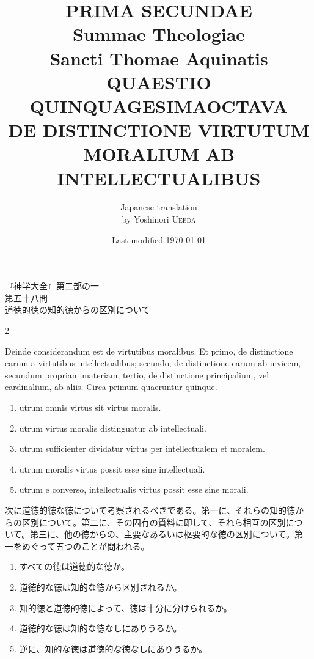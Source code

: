 \documentclass[paper=a4paper,fontsize=10pt,jafontsize=9pt,titlepage]{jlreq}
\title{{\bfseries PRIMA SECUNDAE}\\{\Huge Summae Theologiae}\\Sancti Thomae
Aquinatis\\{\sffamily QUAESTIO QUINQUAGESIMAOCTAVA}\\DE DISTINCTIONE
VIRTUTUM MORALIUM AB INTELLECTUALIBUS}
\author{Japanese translation\\by Yoshinori {\scshape Ueeda}}
\date{Last modified \today}
\begin{document}
\maketitle

\begin{center}
{\LARGE 『神学大全』第二部の一}\\
{\Large 第五十八問\\道徳的徳の知的徳からの区別について}
\end{center}


\begin{paracol}{2}

Deinde considerandum est de virtutibus moralibus. Et primo, de
distinctione earum a virtutibus intellectualibus; secundo, de
distinctione earum ab invicem, secundum propriam materiam; tertio, de
distinctione principalium, vel cardinalium, ab aliis. Circa primum
quaeruntur quinque.

\begin{enumerate}
 \item utrum omnis virtus sit virtus moralis.
 \item utrum virtus moralis distinguatur ab intellectuali.
 \item utrum sufficienter dividatur virtus per intellectualem et moralem.
 \item utrum moralis virtus possit esse sine intellectuali.
 \item utrum e converso, intellectualis virtus possit esse sine
 morali.
\end{enumerate}

\switchcolumn

次に道徳的徳な徳について考察されるべきである。第一に、それらの知的徳か
らの区別について。第二に、その固有の質料に即して、それら相互の区別につ
いて。第三に、他の徳からの、主要なあるいは枢要的な徳の区別について。第
一をめぐって五つのことが問われる。

\begin{enumerate}
 \item すべての徳は道徳的な徳か。
 \item 道徳的な徳は知的な徳から区別されるか。
 \item 知的徳と道徳的徳によって、徳は十分に分けられるか。
 \item 道徳的な徳は知的な徳なしにありうるか。
 \item 逆に、知的な徳は道徳的な徳なしにありうるか。
\end{enumerate}

\end{paracol}
\newpage
{}
{}
\setcounter{section}{1}
\setcounter{subsection}{0}
\end{document}
